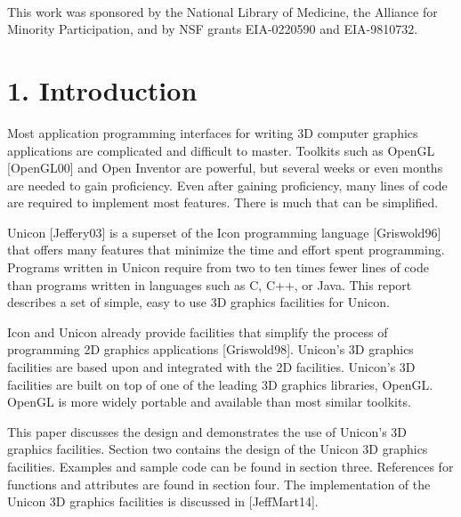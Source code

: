 \documentclass[letterpaper]{article}
\begin{document}
\ \\

\bigskip

\bigskip

\bigskip

\bigskip

\bigskip

\bigskip

This work was sponsored by the National Library of Medicine, the
Alliance for Minority Participation, and by NSF grants
EIA-0220590 and EIA-9810732.

\pagebreak

\section[1. Introduction]{1. Introduction}

\bigskip

Most application programming interfaces for writing 3D computer
graphics applications are complicated and difficult to
master. Toolkits such as OpenGL [OpenGL00] and Open Inventor are
powerful, but several weeks or even months are needed to gain
proficiency. Even after gaining proficiency, many lines of code are
required to implement most features. There is much that can be
simplified.

Unicon [Jeffery03] is a superset of the Icon programming language
[Griswold96] that offers many features that minimize the time and
effort spent programming. Programs written in Unicon require from two
to ten times fewer lines of code than programs written in languages
such as C, C++, or Java. This report describes a set of simple, easy
to use 3D graphics facilities for Unicon.

Icon and Unicon already provide facilities that simplify the process
of programming 2D graphics applications [Griswold98]. Unicon's 3D
graphics facilities are based upon and integrated with the 2D
facilities. Unicon's 3D facilities are built on top of one of the
leading 3D graphics libraries, OpenGL. OpenGL is more widely portable
and available than most similar toolkits.

This paper discusses the design and demonstrates the use of Unicon's
3D graphics facilities. Section two contains the design of the Unicon
3D graphics facilities. Examples and sample code can be found in
section three. References for functions and attributes are found in
section four. The implementation of the Unicon 3D graphics facilities
is discussed in [JeffMart14].
\end{document}
